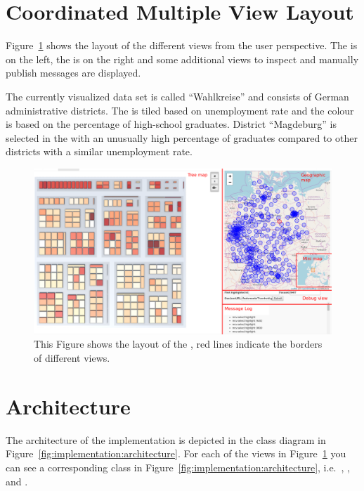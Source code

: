 \section{Coordinated Multiple View Layout}

Figure~\ref{fig:implementation:layout} shows the layout of the different views from the user perspective.
The \tmap{} is on the left, the \gv{} is on the right and some additional views to inspect and manually publish messages are displayed.

The currently visualized data set is called ``Wahlkreise'' and consists of German administrative districts.
The \tmap{} is tiled based on unemployment rate and the colour is based on the percentage of high-school graduates.
District ``Magdeburg'' is selected in the \gv{} with an unusually high percentage of graduates compared to other districts with a similar unemployment rate.

\begin{figure}[ht]
  \centering
  \includegraphics[width=\textwidth]{figures/implementation/Layout}
  \caption{%
    This Figure shows the layout of the \cmv{}, red lines indicate the borders of different views.
  }\label{fig:implementation:layout}
\end{figure}


\section{Architecture}
The architecture of the implementation is depicted in the class diagram in Figure~\ref{fig:implementation:architecture}.
For each of the views in Figure~\ref{fig:implementation:layout} you can see a corresponding class in Figure~\ref{fig:implementation:architecture}, i.e.\ , ,  and .

